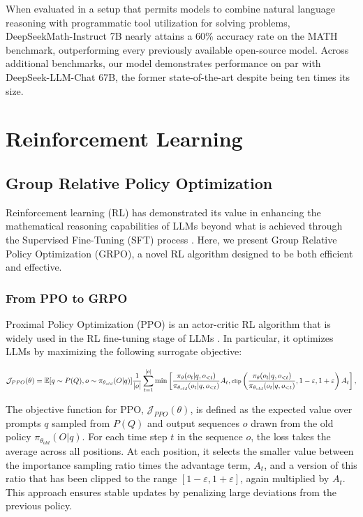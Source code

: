 \begin{itemize}[topsep=0pt]
When evaluated in a setup that permits models to combine natural language reasoning with programmatic tool utilization for solving problems, DeepSeekMath-Instruct 7B nearly attains a 60\% accuracy rate on the MATH benchmark, outperforming every previously available open-source model. Across additional benchmarks, our model demonstrates performance on par with DeepSeek-LLM-Chat 67B, the former state-of-the-art despite being ten times its size.
\section{Reinforcement Learning}

\subsection{Group Relative Policy Optimization} Reinforcement learning (RL) has demonstrated its value in enhancing the mathematical reasoning capabilities of LLMs beyond what is achieved through the Supervised Fine-Tuning (SFT) process \citep{wang2023math,wizardmath}. Here, we present Group Relative Policy Optimization (GRPO), a novel RL algorithm designed to be both efficient and effective.

\subsubsection{From PPO to GRPO} Proximal Policy Optimization (PPO) \citep{schulman2017proximal} is an actor-critic RL algorithm that is widely used in the RL fine-tuning stage of LLMs \citep{ouyang2022training}. In particular, it optimizes LLMs by maximizing the following surrogate objective:

\begin{equation}
\footnotesize
    \mathcal{J}_{PPO}(\theta) = \mathbb{E}{[q \sim P(Q), o \sim \pi_{\theta_{old}}(O|q)]} \frac{1}{|o|} \sum_{t=1}^{|o|} \min \left[ \frac{\pi_\theta(o_{t} | q, o_{<t})}{\pi_{\theta_{old}}(o_{t} | q, o_{<t})} A_{t}, \text{clip} \left( \frac{\pi_\theta(o_{t} | q, o_{<t})}{\pi_{\theta_{old}}(o_{t} | q, o_{<t})}, 1 - \varepsilon, 1 + \varepsilon \right)  A_{t} \right] ,
\end{equation}

The objective function for PPO, $\mathcal{J}_{PPO}(\theta)$, is defined as the expected value over prompts $q$ sampled from $P(Q)$ and output sequences $o$ drawn from the old policy $\pi_{\theta_{old}}(O|q)$. For each time step $t$ in the sequence $o$, the loss takes the average across all positions. At each position, it selects the smaller value between the importance sampling ratio times the advantage term, $A_t$, and a version of this ratio that has been clipped to the range $[1 - \varepsilon, 1 + \varepsilon]$, again multiplied by $A_t$. This approach ensures stable updates by penalizing large deviations from the previous policy.


\end{itemize}

